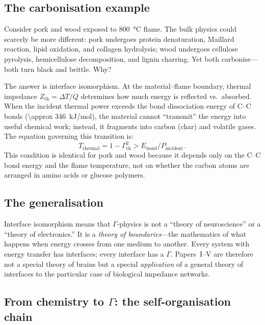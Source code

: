 \documentclass[aps,pre,twocolumn,superscriptaddress,floatfix]{revtex4-2}
\begin{document}
\subsection{The carbonisation example}

Consider pork and wood exposed to \SI{800}{\celsius} flame.
The bulk physics could scarcely be more different:
pork undergoes protein denaturation, Maillard reaction,
lipid oxidation, and collagen hydrolysis;
wood undergoes cellulose pyrolysis, hemicellulose decomposition,
and lignin charring.
Yet both carbonise---both turn black and brittle.
Why?

The answer is interface isomorphism.
At the material--flame boundary, thermal impedance
$Z_{\text{th}} = \Delta T / \dot{Q}$ determines how much
energy is reflected vs.\ absorbed.
When the incident thermal power exceeds the bond dissociation
energy of $\text{C--C}$ bonds (\SI{\approx 346}{kJ/mol}),
the material cannot ``transmit'' the energy into useful
chemical work; instead, it fragments into carbon (char)
and volatile gases.
The equation governing this transition is:
\begin{equation}
  T_{\text{thermal}} = 1 - \Gamma_{\text{th}}^2
  > E_{\text{bond}} / P_{\text{incident}}\,.
  \label{eq:carbonise}
\end{equation}
This condition is identical for pork and wood because it
depends only on the C--C bond energy and the flame temperature,
not on whether the carbon atoms are arranged in amino acids
or glucose polymers.

\subsection{The generalisation}

Interface isomorphism means that $\Gamma$-physics is not a
``theory of neuroscience'' or a ``theory of electronics.''
It is a \emph{theory of boundaries}---the mathematics of
what happens when energy crosses from one medium to another.
Every system with energy transfer has interfaces;
every interface has a $\Gamma$.
Papers~I--V are therefore not a special theory of brains
but a special \emph{application} of a general theory of interfaces
to the particular case of biological impedance networks.

\subsection{From chemistry to $\Gamma$: the self-organisation chain}
\label{sec:self-org-chain}
\end{document}
